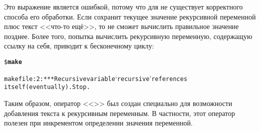 Это выражение является ошибкой, потому что для \GNUmake{} не
существует корректного способа его обработки. Если \GNUmake{} сохранит
текущее значение рекурсивной переменной плюс текст <<что-то ещё>>, то
не сможет вычислить правильное значение позднее. Более того, попытка
вычислить рекурсивную переменную, содержащую ссылку на себя, приводит
к бесконечному циклу:

{\footnotesize
\begin{alltt}
\$ \textbf{make}

makefile:2: *** Recursive variable `recursive' references
itself (eventually).  Stop.
\end{alltt}
}

Таким образом, оператор <<\command{+=}>> был создан специально для
возможности добавления текста к рекурсивным переменным. В частности,
этот оператор полезен при инкрементом определении значения переменной.
